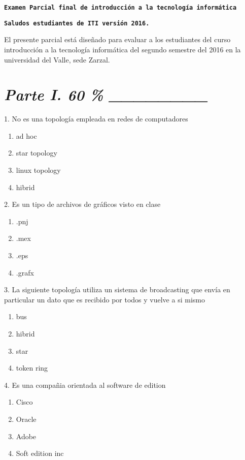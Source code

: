 \documentclass{article}
\begin{document}
\centerline{\bf  \texttt{Examen Parcial final de introducción a la tecnología informática}} 

\centerline{\bf  \texttt{Saludos estudiantes de ITI versi\'on 2016.}}
El presente parcial está diseñado para evaluar a los estudiantes del curso introducción a la tecnología informática del segundo semestre del 2016 en la universidad del Valle, sede Zarzal.

\section{\textit{Parte I. 60 \% \_\_\_\_\_\_\_\_}}




1.   No es una topología empleada en redes de computadores

\begin{enumerate}[label=(\Alph*)]
\item ad hoc
\item star topology
\item linux topology
\item hibrid
\end{enumerate}

2.  Es un tipo de archivos de gráficos visto en clase

\begin{enumerate}[label=(\Alph*)]
\item .pnj
\item .mex
\item .eps
\item .grafx
\end{enumerate} 
 
3. La siguiente topología utiliza un sistema de broadcasting que envía en particular un dato que es recibido por todos y vuelve a si mismo
\begin{enumerate}[label=(\Alph*)]
\item bus
\item hibrid
\item star
\item token ring
\end{enumerate} 

4. Es una compañia orientada al software de edition
\begin{enumerate}[label=(\Alph*)]
\item Cisco
\item Oracle
\item Adobe
\item Soft edition inc
\end{enumerate} 
\end{document}
